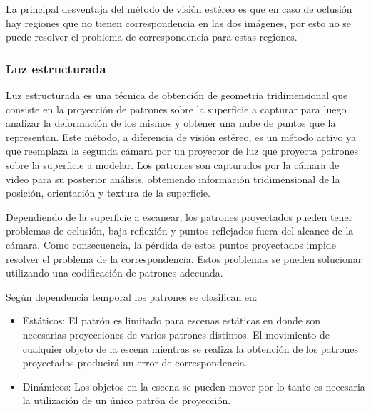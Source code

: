 La principal desventaja del método de visión estéreo es que en caso de oclusión hay regiones que no tienen correspondencia en las dos imágenes, por esto no se puede resolver el problema de correspondencia para estas regiones.

\subsubsection{Luz estructurada}

Luz estructurada es una técnica de obtención de geometría tridimensional que consiste en la proyección de patrones sobre la superficie a capturar para luego analizar la deformación de los mismos y obtener una nube de puntos que la representan. Este método, a diferencia de visión estéreo, es un método activo ya que reemplaza la segunda cámara por un proyector de luz que proyecta patrones sobre la superficie a modelar.
Los patrones son capturados por la cámara de video para su posterior análisis, obteniendo información tridimensional de la posición, orientación y textura de la superficie\cite{SLightPatterns}.

Dependiendo de la superficie a escanear, los patrones proyectados pueden tener problemas de oclusión, baja reflexión y puntos reflejados fuera del alcance de la cámara. Como consecuencia, la pérdida de estos puntos proyectados impide resolver el problema de la correspondencia.
Estos problemas se pueden solucionar utilizando una codificación de patrones adecuada\cite{SLightCorrespondence}.

Según dependencia temporal los patrones se clasifican en:
\begin{itemize}
	\item Estáticos: El patrón es limitado para escenas estáticas en donde son necesarias proyecciones de varios patrones distintos. El movimiento de cualquier objeto de la escena mientras se realiza la obtención de los patrones proyectados producirá un error de correspondencia.
	\item Dinámicos: Los objetos en la escena se pueden mover por lo tanto es necesaria la utilización de un único patrón de proyección.
\end{itemize}

